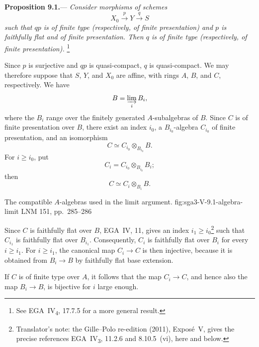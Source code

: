 \medskip
{}
\label{prop:sga3-V-9.1}%
\noindent\textbf{Proposition 9.1.}---%
\textit{Consider morphisms of schemes}
\[
  X_0\xrightarrow{\,p\,}Y\xrightarrow{\,q\,}S
\]
\textit{such that \(qp\) is of finite type (respectively, of finite
presentation) and \(p\) is faithfully flat and of finite
presentation. Then \(q\) is of finite type (respectively, of finite
presentation).}%
\begingroup
\renewcommand{\thefootnote}{*}%
\footnote{\label{note:sga3-V-9.1-generalization}See
EGA~IV\textsubscript{4}, 17.7.5 for a more general result.}
\endgroup
\addtocounter{footnote}{-1}%

\noindent Since \(p\) is surjective and \(qp\) is quasi-compact,
\(q\) is quasi-compact. We may therefore suppose that \(S\), \(Y\),
and \(X_0\) are affine, with rings \(A\), \(B\), and \(C\),
respectively. We have
\[
  B=\varinjlim_i B_i,
\]
where the \(B_i\) range over the finitely generated
\(A\)-subalgebras of \(B\). Since \(C\) is of finite presentation
over \(B\), there exist an index \(i_0\), a \(B_{i_0}\)-algebra
\(C_{i_0}\) of finite presentation, and an isomorphism
\[
  C\simeq C_{i_0}\otimes_{B_{i_0}}B.
\]
For \(i\geq i_0\), put
\[
  C_i=C_{i_0}\otimes_{B_{i_0}}B_i;
\]
then
\[
  C\simeq C_i\otimes_{B_i}B.
\]

  {The compatible \(A\)-algebras used in the limit argument.}
  {fig:sga3-V-9.1-algebra-limit}
  {LNM 151, pp.~285--286}

Since \(C\) is faithfully flat over \(B\), EGA~IV, 11, gives an index
\(i_1\geq i_0\)\footnote{Translator's note: the Gille--Polo re-edition (2011), Exposé~V, gives the
precise references EGA~IV\textsubscript{3}, 11.2.6 and 8.10.5~(vi), here and below.} such that
\(C_{i_1}\) is faithfully flat over \(B_{i_1}\). Consequently,
\(C_i\) is faithfully flat over \(B_i\) for every \(i\geq i_1\).
For \(i\geq i_1\), the canonical map \(C_i\to C\) is then injective,
because it is obtained from \(B_i\to B\) by faithfully flat base
extension.


If \(C\) is of finite type over \(A\), it follows that the map
\(C_i\to C\), and hence also the map \(B_i\to B\), is bijective for \(i\)
large enough.

